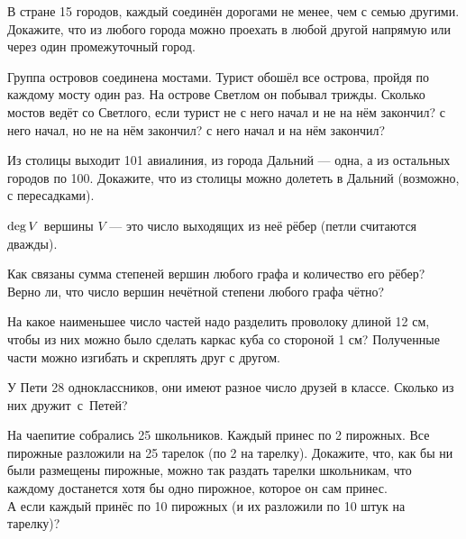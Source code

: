 \documentclass[a4paper,11pt]{article}
\begin{document}
В стране 15 городов, каждый соедин\"ен
дорогами не менее, чем с семью другими.
Докажите, что из любого
города можно проехать в любой другой напрямую или
через один промежуточный город.

Группа островов соединена мостами.
Турист обошёл
все острова, пройдя по каждому мосту %
один раз. На острове
Светлом он побывал трижды. Сколько мостов ведёт со
Светлого, если турист
не с него начал и не на нём закончил?
с него начал, но не на нём закончил?
с него начал и на нём закончил?

Из столицы выходит 101 авиалиния, из
города Дальний --- одна, а из остальных городов по 100. Докажите,
что из столицы можно долететь в Дальний (возможно, с пересадками).


 ${\rm deg}\, V$ вершины $V$  --- это  число
выходящих из не\"е р\"ебер (петли считаются дважды).

Как связаны сумма степеней вершин любого графа
и количество его р\"ебер?\\
Верно ли, что число вершин неч\"етной степени любого графа ч\"етно?

На какое наименьшее число частей надо разделить проволоку длиной 12 см, чтобы
из них можно было сделать каркас куба со стороной 1 см? Полученные части можно %
изгибать и скреплять друг с другом.


У Пети 28 одноклассников, %
они имеют разное
число друзей
в %
классе. Сколько из них дружит~\hbox{с Петей?}

На чаепитие собрались 25 школьников. Каждый принес по 2 пирожных.
Все пирожные раз\-ло\-жи\-ли на 25 тарелок (по 2 на тарелку).
Докажите, что, как бы ни были размещены пирожные,
можно так раздать тарелки школьникам, что каждому
достанется хотя бы одно пирожное, которое он сам принес.\\
  А если каждый принёс по 10 пирожных (и их разложили
по 10 штук на тарелку)?
\end{document}
